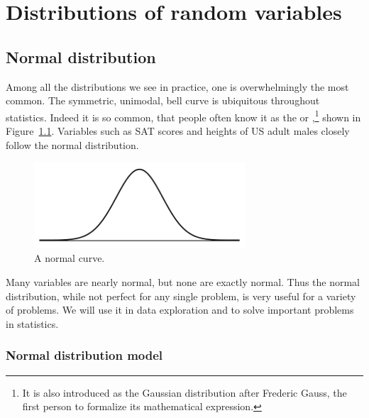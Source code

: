\chapter{Distributions of random variables}
\label{modeling}


\section{Normal distribution}
\label{normalDist}

Among all the distributions we see in practice, one is overwhelmingly the most common. The symmetric, unimodal, bell curve is ubiquitous throughout statistics. Indeed it is so common, that people often know it as the  or ,\footnote{It is also introduced as the Gaussian distribution after Frederic Gauss, the first person to formalize its mathematical expression.} shown in Figure~\ref{simpleNormal}. Variables such as SAT scores and heights of US adult males closely follow the normal distribution.

\begin{figure}
\centering
\includegraphics[width=0.7\textwidth]{ch_distributions/figures/simpleNormal/simpleNormal}
\caption{A normal curve.}
\label{simpleNormal}
\end{figure}

\begin{termBox}{
Many variables are nearly normal, but none are exactly normal. Thus the normal distribution, while not perfect for any single problem, is very useful for a variety of problems. We will use it in data exploration and to solve important problems in statistics.\vspace{0.7mm}}
\end{termBox}


\subsection{Normal distribution model}

